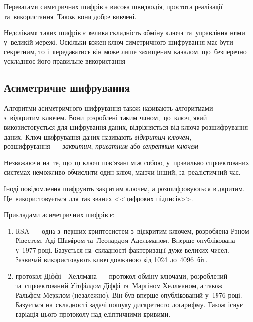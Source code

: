 \documentclass[a4paper,oneside,titlepage,14pt]{extarticle}
\begin{document}
			Перевагами симетричних шифрів є висока швидкодія, простота реалізації та~використання. Також вони добре вивчені.\par
			
			Недоліками таких шифрів є велика складність обміну ключа та~управління ними у~великій мережі. Оскільки кожен ключ симетричного шифрування має бути секретним, то і~передаватись він може лише захищеним каналом, що~безперечно ускладнює його правильне використання.\par
			
		\subsection{Асиметричне шифрування}
			Алгоритми асиметричного шифрування також називають алгоритмами з~відкритим ключем. Вони розроблені таким чином, що~ключ, який використовується для шифрування даних, відрізняється від ключа розшифрування даних. Ключ шифрування даних називають \textit{відкритим ключем}, розшифрування~--- \textit{закритим}, \textit{приватним} або \textit{секретним ключем}.\par

			Незважаючи на~те, що~ці ключі пов'язані між собою, у~правильно спроектованих системах неможливо обчислити один ключ, маючи інший, за~реалістичний час. \par
				
			Іноді повідомлення шифрують закритим ключем, а розшифровуються відкритим. Це~використовується для так званих <<цифрових підписів>>.\par
				
			Прикладами асиметричних шифрів є:
			\begin{enumerate}
				\item RSA~--- одна з~перших криптосистем з~відкритим ключем, розроблена Роном Рівестом, Аді Шаміром та~Леонардом Адельманом. Вперше опублікована у~1977 році. Базується на~складності факторизації дуже великих чисел. Зазвичай використовують ключ довжиною від 1024 до~4096~біт.
				\item протокол Діффі---Хеллмана~--- протокол обміну ключами, розроблений та~спроектований Уітфілдом Діффі та~Мартіном Хеллманом, а також Ральфом Мерклом (незалежно). Він був вперше опублікований у~1976 році. Базується на~складності задачі пошуку дискретного логарифму. Також існує варіація цього протоколу над еліптичними кривими.
			\end{enumerate}
			\par
				
\end{document}
